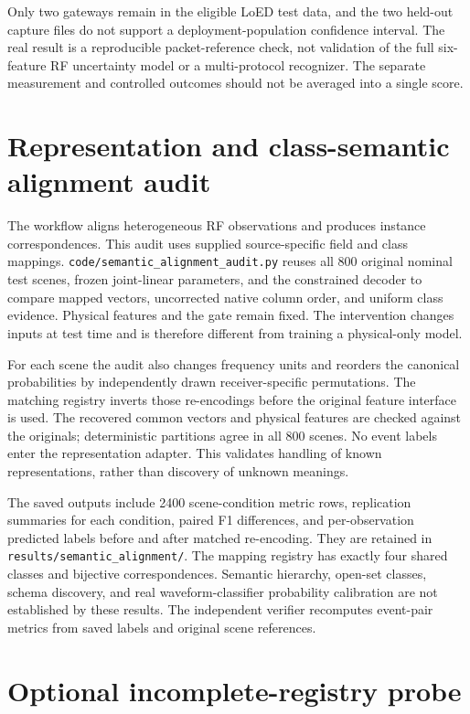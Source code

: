 \documentclass[10pt,a4paper]{article}
\begin{document}
Only two gateways remain in the eligible LoED test data, and the two held-out capture files do not support a deployment-population confidence interval. The real result is a reproducible packet-reference check, not validation of the full six-feature RF uncertainty model or a multi-protocol recognizer. The separate measurement and controlled outcomes should not be averaged into a single score.

\section{Representation and class-semantic alignment audit}
The workflow aligns heterogeneous RF observations and produces instance correspondences. This audit uses supplied source-specific field and class mappings. \texttt{code/semantic\_alignment\_audit.py} reuses all 800 original nominal test scenes, frozen joint-linear parameters, and the constrained decoder to compare mapped vectors, uncorrected native column order, and uniform class evidence. Physical features and the gate remain fixed. The intervention changes inputs at test time and is therefore different from training a physical-only model.

For each scene the audit also changes frequency units and reorders the canonical probabilities by independently drawn receiver-specific permutations. The matching registry inverts those re-encodings before the original feature interface is used. The recovered common vectors and physical features are checked against the originals; deterministic partitions agree in all 800 scenes. No event labels enter the representation adapter. This validates handling of known representations, rather than discovery of unknown meanings.

The saved outputs include 2400 scene-condition metric rows, replication summaries for each condition, paired F1 differences, and per-observation predicted labels before and after matched re-encoding. They are retained in \texttt{results/semantic\_alignment/}. The mapping registry has exactly four shared classes and bijective correspondences. Semantic hierarchy, open-set classes, schema discovery, and real waveform-classifier probability calibration are not established by these results. The independent verifier recomputes event-pair metrics from saved labels and original scene references.
\section{Optional incomplete-registry probe}\label{supp:partial_probe}
\end{document}
